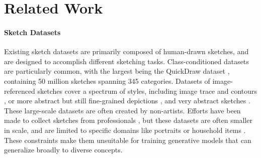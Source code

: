 \section{Related Work}
\paragraph{\textbf{Sketch Datasets}}
Existing sketch datasets are primarily composed of human-drawn sketches, and are designed to accomplish different sketching tasks. Class-conditioned datasets \cite{Eitz2012HowDH,SketchRNN} are particularly common, with the largest being the QuickDraw dataset \cite{SketchRNN}, containing 50 million sketches spanning 345 categories. Datasets of image-referenced sketches cover a spectrum of styles, including image trace and contours \cite{Wang2021Tracing,Li2019PhotoSketchingIC,ArbelaezBSDS500,Eitz2012HowDH}, or more abstract but still fine-grained depictions \cite{Sangkloy2016TheSD,SketchyCOCO2020}, and very abstract sketches \cite{Mukherjee2023SEVALS}. These large-scale datasets are often created by non-artists.
Efforts have been made to collect sketches from professionals \cite{Berger2013StyleAA, Gryaditskaya2019OpenSketch, Han2023AGF, Xiao2022DifferSketching}, but these datasets are often smaller in scale, and are limited to specific domains like portraits \cite{Berger2013StyleAA} or household items \cite{Gryaditskaya2019OpenSketch}. These constraints make them unsuitable for training generative models that can generalize broadly to diverse concepts.

